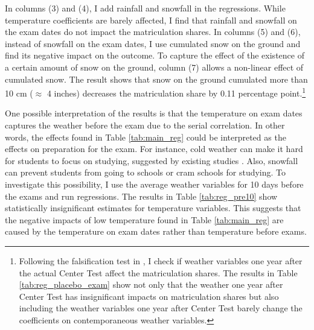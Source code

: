 \documentclass[12pt,letterpaper]{article}
\begin{document}
In columns (3) and (4), I add rainfall and snowfall in the regressions.
While temperature coefficients are barely affected, I find that rainfall and snowfall on the exam dates do not impact the matriculation shares.
In columns (5) and (6), instead of snowfall on the exam dates, I use cumulated snow on the ground and find its negative impact on the outcome. 
To capture the effect of the existence of a certain amount of snow on the ground, column (7) allows a non-linear effect of cumulated snow.
The result shows that snow on the ground cumulated more than 10 cm ($\approx$ 4 inches) decreases the matriculation share by 0.11 percentage point.\footnote{
  Following the falsification test in \citet{Cho2017}, I check if weather variables one year after the actual Center Test affect the matriculation shares.
  The results in Table \ref{tab:reg_placebo_exam} show not only that the weather one year after Center Test has insignificant impacts on matriculation shares but also including the weather variables one year after Center Test barely change the coefficients on contemporaneous weather variables.
}

%  

One possible interpretation of the results is that the temperature on exam dates captures the weather before the exam due to the serial correlation.
In other words, the effects found in Table \ref{tab:main_reg} could be interpreted as the effects on preparation for the exam. 
For instance, cold weather can make it hard for students to focus on studying, suggested by existing studies \citep{Taylor2016}.
Also, snowfall can prevent students from going to schools or cram schools for studying.
To investigate this possibility, I use the average weather variables for 10 days before the exams and run regressions.
The results in Table \ref{tab:reg_pre10} show statistically insignificant estimates for temperature variables.
This suggests that the negative impacts of low temperature found in Table \ref{tab:main_reg} are caused by the temperature on exam dates rather than temperature before exams.
\end{document}
